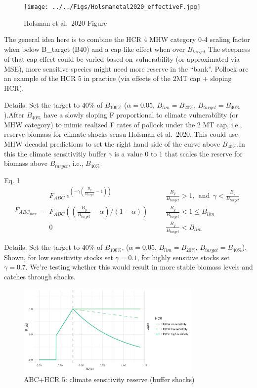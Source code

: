\documentclass[
]{article}
\begin{document}
\begin{figure}
\centering
\texttt{[image: ../../Figs/Holsmanetal2020\_effectiveF.jpg]}
\caption{Holsman et al.~2020 Figure}
\end{figure}

The general idea here is to combine the HCR 4 MHW category 0-4 scaling
factor when below B\_target (B40) and a cap-like effect when over
\(B_{target}\) The steepness of that cap effect could be varied based on
vulnerability (or approximated via MSE), more sensitive species might
need more reserve in the ``bank''. Pollock are an example of the HCR 5
in practice (via effects of the 2MT cap + sloping HCR).

Details: Set the target to 40\% of \(B_{100\%}\) (\(\alpha = 0.05\),
\(B_{lim} = B_{20\%}\), \(B_{target} = B_{40\%}\)).After \(B_{40\%}\)
have a slowly sloping F proportional to climate vulnerability (or MHW
category) to mimic realized F rates of pollock under the 2 MT cap, i.e.,
reserve biomass for climate shocks sensu Holsman et al.~2020. This could
use MHW decadal predictions to set the right hand side of the curve
above \(B_{40\%}\).In this the climate sensitivitiy buffer \(\gamma\) is
a value 0 to 1 that scales the reserve for biomass above \(B_{target}\),
i.e., \(B_{40\%}\):

Eq. 1 \[F_{ABC_{max}} = \begin{array}{lll}  
 F_{ABC}\ e^{(-\gamma(\frac{B_y}{B_{target}}-1))} &~~~~~~~~\frac{B_y}{B_{target}}>1, ~~\mathrm{and}~~ \gamma < \frac{B_y}{B_{target}}\\ 
 F_{ABC}((\frac{B_y}{B_{target}}-\alpha)/(1-\alpha)) &~~~~~~~~ \frac{B_y}{B_{target}} < 1 \leq B_{lim} \\  
 0 &~~~~~~~~ \frac{B_y}{B_{target}} < B_{lim}  
 \end{array}
 \]

Details: Set the target to 40\% of \(B_{100\%}\), (\(\alpha = 0.05\),
\(B_{lim} = B_{20\%}\), \(B_{target} = B_{40\%}\)). Shown, for low
sensitivity stocks set \(\gamma = 0.1\), for highly sensitive stocks set
\(\gamma = 0.7\). We're testing whether this would result in more stable
biomass levels and catches through shocks.

\begin{figure}
\centering
\includegraphics[width=0.8\textwidth,height=\textheight]{../../Figs/HCR_figs/HCR5.png}
\caption{ABC+HCR 5: climate sensitivity reserve (buffer shocks)}
\end{figure}
\end{document}

